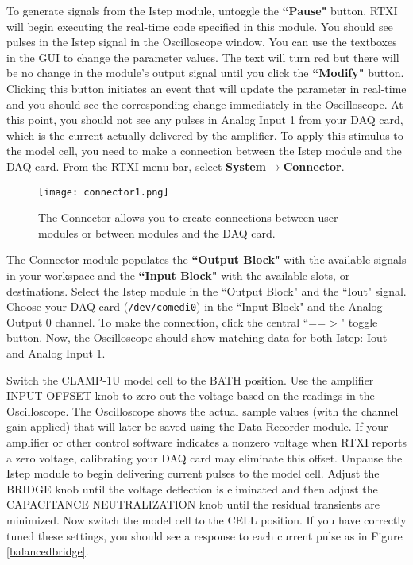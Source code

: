 \vspace{1cm}
To generate signals from the Istep module, untoggle the \textbf{``Pause"} button. RTXI will begin executing the real-time code specified in this module. You should see pulses in the Istep signal in the Oscilloscope window. You can use the textboxes in the GUI to change the parameter values. The text will turn red but there will be no change in the module's output signal until you click the \textbf{``Modify"} button. Clicking this button initiates an event that will update the parameter in real-time and you should see the corresponding change immediately in the Oscilloscope. At this point, you  should not see any pulses in Analog Input 1 from your DAQ card, which is the current actually delivered by the amplifier. To apply this stimulus to the model cell, you need to make a connection between the Istep module and the DAQ card. From the RTXI menu bar, select \textbf{System}$\rightarrow$\textbf{Connector}. 

\begin{figure}[h]
\begin{center}
\texttt{[image: connector1.png]} 
\caption[Connector]{The Connector allows you to create connections between user modules or between modules and the DAQ card.} 
\end{center}
\end{figure}

The Connector module populates the \textbf{``Output Block"} with the available signals in your workspace and the \textbf{``Input Block"} with the available slots, or destinations. Select the Istep module in the ``Output Block" and the ``Iout" signal. Choose your DAQ card (\texttt{/dev/comedi0}) in the ``Input Block" and the Analog Output 0 channel. To make the connection, click the central ``==$>$" toggle button. Now, the Oscilloscope should show matching data for both Istep: Iout and Analog Input 1.

\vspace{1cm}
Switch the CLAMP-1U model cell to the BATH position. Use the amplifier INPUT OFFSET knob to zero out the voltage based on the readings in the Oscilloscope. The Oscilloscope shows the actual sample values (with the channel gain applied) that will later be saved using the Data Recorder module. If your amplifier or other control software indicates a nonzero voltage when RTXI reports a zero voltage, calibrating your DAQ card may eliminate this offset. Unpause the Istep module to begin delivering current pulses to the model cell. Adjust the BRIDGE knob until the voltage deflection is eliminated and then adjust the CAPACITANCE NEUTRALIZATION knob until the residual transients are minimized. Now switch the model cell to the CELL position. If you have correctly tuned these settings, you should see a response to each current pulse as in Figure \ref{balancedbridge}.

